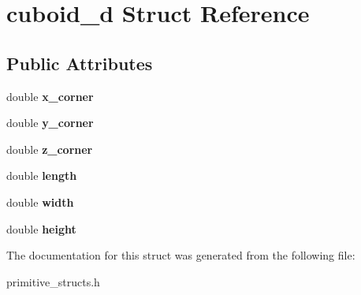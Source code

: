 \hypertarget{structcuboid__d}{}\section{cuboid\+\_\+d Struct Reference}
\label{structcuboid__d}
\subsection*{Public Attributes}
\begin{DoxyCompactItemize}
\item 
double {\bfseries x\+\_\+corner}\hypertarget{structcuboid__d_a75c0d6b84b3f38b0e518ec6b0d1289ea}{}\label{structcuboid__d_a75c0d6b84b3f38b0e518ec6b0d1289ea}

\item 
double {\bfseries y\+\_\+corner}\hypertarget{structcuboid__d_a2dbe5639ad72d8483e419254024c4836}{}\label{structcuboid__d_a2dbe5639ad72d8483e419254024c4836}

\item 
double {\bfseries z\+\_\+corner}\hypertarget{structcuboid__d_ae1b66ac006313bc32a5b56bedf9a26a0}{}\label{structcuboid__d_ae1b66ac006313bc32a5b56bedf9a26a0}

\item 
double {\bfseries length}\hypertarget{structcuboid__d_a4ac2c61513b4cfd4f544b1014e76fde0}{}\label{structcuboid__d_a4ac2c61513b4cfd4f544b1014e76fde0}

\item 
double {\bfseries width}\hypertarget{structcuboid__d_afede6ea5a0dd61ebdc637a9d52c90c91}{}\label{structcuboid__d_afede6ea5a0dd61ebdc637a9d52c90c91}

\item 
double {\bfseries height}\hypertarget{structcuboid__d_aca8ad0a80f420155841d710b59a566c0}{}\label{structcuboid__d_aca8ad0a80f420155841d710b59a566c0}

\end{DoxyCompactItemize}


The documentation for this struct was generated from the following file\+:\begin{DoxyCompactItemize}
\item 
primitive\+\_\+structs.\+h\end{DoxyCompactItemize}
